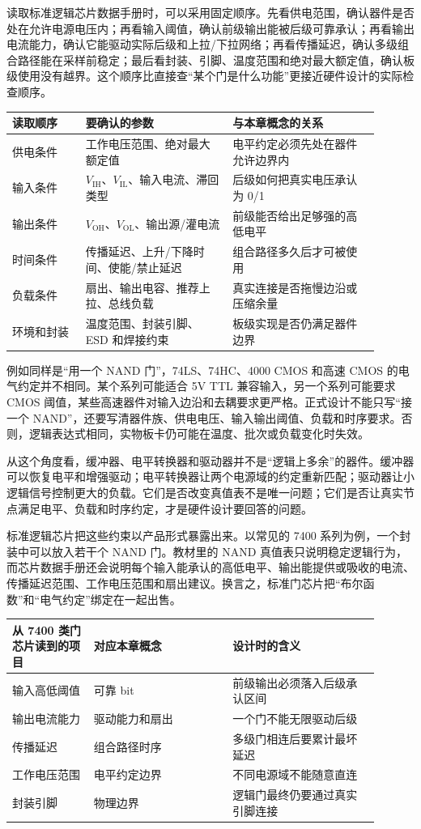 读取标准逻辑芯片数据手册时，可以采用固定顺序。先看供电范围，确认器件是否处在允许电源电压内；再看输入阈值，确认前级输出能被后级可靠承认；再看输出电流能力，确认它能驱动实际后级和上拉/下拉网络；再看传播延迟，确认多级组合路径能在采样前稳定；最后看封装、引脚、温度范围和绝对最大额定值，确认板级使用没有越界。这个顺序比直接查“某个门是什么功能”更接近硬件设计的实际检查顺序。

\begin{longtable}{L{0.18\linewidth}L{0.36\linewidth}L{0.36\linewidth}}
\toprule
读取顺序 & 要确认的参数 & 与本章概念的关系 \\
\midrule
供电条件 & 工作电压范围、绝对最大额定值 & 电平约定必须先处在器件允许边界内 \\
输入条件 & $V_\mathrm{IH}$、$V_\mathrm{IL}$、输入电流、滞回类型 & 后级如何把真实电压承认为 0/1 \\
输出条件 & $V_\mathrm{OH}$、$V_\mathrm{OL}$、输出源/灌电流 & 前级能否给出足够强的高低电平 \\
时间条件 & 传播延迟、上升/下降时间、使能/禁止延迟 & 组合路径多久后才可被使用 \\
负载条件 & 扇出、输出电容、推荐上拉、总线负载 & 真实连接是否拖慢边沿或压缩余量 \\
环境和封装 & 温度范围、封装引脚、ESD 和焊接约束 & 板级实现是否仍满足器件边界 \\
\bottomrule
\end{longtable}

例如同样是“用一个 NAND 门”，74LS、74HC、4000 CMOS 和高速 CMOS 的电气约定并不相同。某个系列可能适合 5V TTL 兼容输入，另一个系列可能要求 CMOS 阈值，某些高速器件对输入边沿和去耦要求更严格。正式设计不能只写“接一个 NAND”，还要写清器件族、供电电压、输入输出阈值、负载和时序要求。否则，逻辑表达式相同，实物板卡仍可能在温度、批次或负载变化时失效。

从这个角度看，缓冲器、电平转换器和驱动器并不是“逻辑上多余”的器件。缓冲器可以恢复电平和增强驱动；电平转换器让两个电源域的约定重新匹配；驱动器让小逻辑信号控制更大的负载。它们是否改变真值表不是唯一问题；它们是否让真实节点满足电平、负载和时序约定，才是硬件设计要回答的问题。

标准逻辑芯片把这些约束以产品形式暴露出来。以常见的 7400 系列为例，一个封装中可以放入若干个 NAND 门。教材里的 NAND 真值表只说明稳定逻辑行为，而芯片数据手册还会说明每个输入能承认的高低电平、输出能提供或吸收的电流、传播延迟范围、工作电压范围和扇出建议。换言之，标准门芯片把“布尔函数”和“电气约定”绑定在一起出售。

\begin{longtable}{L{0.2\linewidth}L{0.34\linewidth}L{0.36\linewidth}}
\toprule
从 7400 类门芯片读到的项目 & 对应本章概念 & 设计时的含义 \\
\midrule
输入高低阈值 & 可靠 bit & 前级输出必须落入后级承认区间 \\
输出电流能力 & 驱动能力和扇出 & 一个门不能无限驱动后级 \\
传播延迟 & 组合路径时序 & 多级门相连后要累计最坏延迟 \\
工作电压范围 & 电平约定边界 & 不同电源域不能随意直连 \\
封装引脚 & 物理边界 & 逻辑门最终仍要通过真实引脚连接 \\
\bottomrule
\end{longtable}

